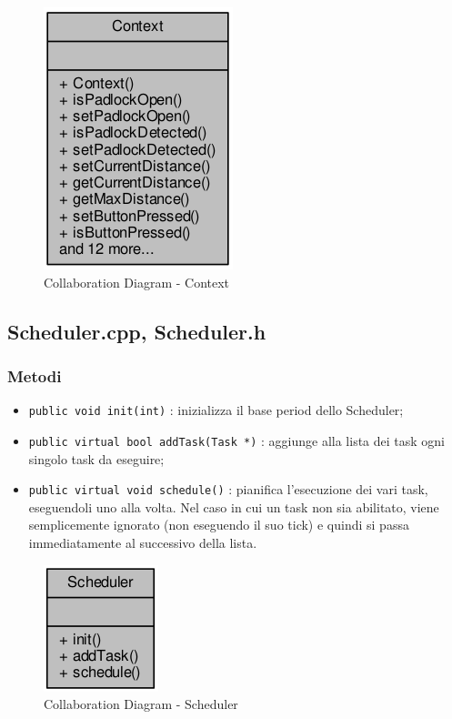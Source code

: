 \begin{figure}[!ht]
	\centering
	\includegraphics[scale=.5]{img/UML/CollaborationDiagram/Context.png}
	\caption{Collaboration Diagram - Context}
\end{figure}

\newpage
\subsection{Scheduler.cpp, Scheduler.h}
\subsubsection{Metodi}
\begin{itemize}
	\item \texttt{public void init(int)} : inizializza il base period dello Scheduler;
	\item \texttt{public virtual bool addTask(Task *)} : aggiunge alla lista dei task ogni singolo task da eseguire;
	\item \texttt{public virtual void schedule()} : pianifica l'esecuzione dei vari task, eseguendoli uno alla volta. Nel caso in cui un task non sia abilitato, viene semplicemente ignorato (non eseguendo il suo tick) e quindi si passa immediatamente al successivo della lista.
\end{itemize}
\begin{figure}[!ht]
	\centering
	\includegraphics[scale=.5]{img/UML/CollaborationDiagram/Scheduler.png}
	\caption{Collaboration Diagram - Scheduler}
\end{figure}

